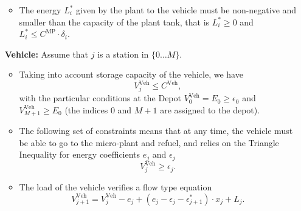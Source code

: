 \documentclass[11pt]{article}
\theoremstyle{plain}%
\theoremstyle{definition} \newtheorem{lem}{Lemma}[section]
\theoremstyle{definition} \newtheorem{claim}{Claim}[lem]
\theoremstyle{definition} \newtheorem{theorem}{Theorem}[section]
\theoremstyle{definition} \newtheorem{exo}{Exercice n$^\circ$}
\theoremstyle{definition} \newtheorem{quest}{}[exo]
\theoremstyle{definition} \newtheorem{sousquest}{}[quest]
\theoremstyle{remark}
\theoremstyle{definition}
\begin{document}
\begin{enumerate}
\begin{itemize}
\item	The energy $L^*_i $ given by the plant to the vehicle must
be non-negative and smaller than the capacity of the plant tank, that is
$L^*_i \geq 0$ and $L^*_i \leq  C^{\textrm{MP}} \cdot \delta_i$. 

\end{itemize}
\item [\bf Vehicle:]
Assume that $j$ is a station in $\{ 0 \ldots M \}$.
\begin{itemize}
\item Taking into account storage capacity of the vehicle, we have 
$$V_{j}^{\textrm{Veh}}\leq C^{\textrm{Veh}},$$
with the particular conditions at the Depot $V_{0}^{\textrm{Veh}}= E_0 \geq \epsilon_0$ and $V_{M+1}^{\textrm{Veh}}\geq E_{0}$ (the indices $0$ and $M+1$ are assigned to the depot).
\item The  following set of constraints means that at any time, the vehicle must be able to go to the micro-plant and refuel, and relies on the Triangle Inequality for energy coefficients $e_j$ and $\epsilon_j$
$$V_{j}^{\textrm{Veh}} \geq \epsilon_{j}.$$ 

\item The load of the vehicle verifies a flow type equation
$$V_{j+1}^{\textrm{Veh}}=V_{j}^{\textrm{Veh}}-e_j + (e_j-\epsilon_j-\epsilon^*_{j+1}) \cdot x_j +L_j.$$


\end{itemize}
\end{enumerate}
\end{document}
